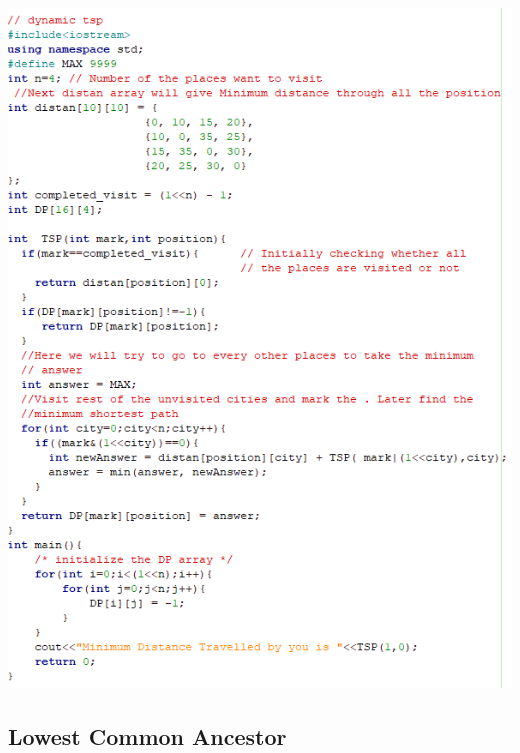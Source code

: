 \documentclass[11pt,twocolumn]{article}
\begin{document}
\includegraphics[scale=0.6]{tsp}

\subsection{Lowest Common Ancestor}
\end{document}
